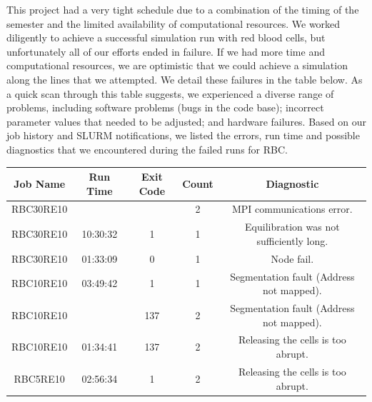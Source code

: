 \documentclass[11pt]{article} %
\begin{document}
This project had a very tight schedule due to a combination of the timing of the semester and the limited availability of computational resources. We worked diligently to achieve a successful simulation run with red blood cells, but unfortunately all of our efforts ended in failure. If we had more time and computational resources, we are optimistic that we could achieve a simulation along the lines that we attempted. We detail these failures in the table below. As a quick scan through this table suggests, we experienced a diverse range of problems, including software problems (bugs in the code base); incorrect parameter values
that needed to be adjusted; and hardware failures. Based on our job history and SLURM notifications, we listed the errors, run time and possible diagnostics that we encountered during the failed runs for RBC. 
\begin{table}[H]
\centering
\begin{tabular}{|c|c|c|c|c|}
\hline
\textbf{Job Name} & \textbf{Run Time} & \textbf{Exit Code} & \multicolumn{1}{l|}{\textbf{Count}} & \textbf{Diagnostic}                                                                     \\ \hline
RBC30RE10         &                   &                    & 2                                   & MPI communications error.                                                               \\ \hline
RBC30RE10         & 10:30:32          & 1                  & 1                                   & Equilibration was not sufficiently long. \\ \hline
RBC30RE10         & 01:33:09          & 0                  & 1                                   & Node fail.     \\ \hline                                                                         
RBC10RE10         & 03:49:42          & 1                  & 1                                   & Segmentation fault (Address not mapped).   \\ \hline
RBC10RE10         &                   & 137                & 2                                   & Segmentation fault (Address not mapped).                                                \\ \hline
RBC10RE10          & 01:34:41          & 137                & 2                                   & Releasing the cells is too abrupt.                                                      \\ \hline
RBC5RE10          & 02:56:34          & 1                  & 2                                   & Releasing the cells is too abrupt.                                                      \\ \hline

\end{tabular}
\end{table}
\end{document}
